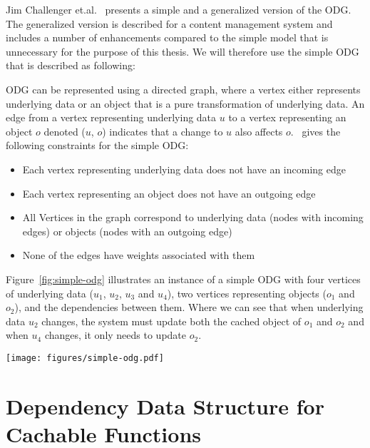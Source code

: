 Jim Challenger et.al.~\cite{paper:ibm-extended} presents a simple and a generalized version of the ODG. The generalized version is described for a content management system and includes a number of enhancements compared to the simple model that is unnecessary for the purpose of this thesis. We will therefore use the simple ODG that is described as following:

ODG can be represented using a directed graph, where a vertex either represents underlying data or an object that is a pure transformation of underlying data. An edge from a vertex representing underlying data $u$ to a vertex representing an object $o$ denoted ($u$, $o$) indicates that a change to $u$ also affects $o$.~\cite{paper:ibm-extended} gives the following constraints for the simple ODG:

\begin{itemize}
  \item Each vertex representing underlying data does not have an incoming edge
  \item Each vertex representing an object does not have an outgoing edge
  \item All Vertices in the graph correspond to underlying data (nodes with incoming edges) or objects (nodes with an outgoing edge)
  \item None of the edges have weights associated with them
\end{itemize}

Figure~\ref{fig:simple-odg} illustrates an instance of a simple ODG with four vertices of underlying data ($u_1$, $u_2$, $u_3$ and $u_4$), two vertices representing objects ($o_1$ and $o_2$), and the dependencies between them. Where we can see that when underlying data $u_2$ changes, the system must update both the cached object of $o_1$ and $o_2$ and when $u_4$ changes, it only needs to update $o_2$.

\begin{figure*}[ht!]
  \centering
  \texttt{[image: figures/simple-odg.pdf]}
  \caption{An example instance of a simple ODG}
  \label{fig:simple-odg}
\end{figure*}


\section{Dependency Data Structure for Cachable Functions}
\label{sec:dependency-data-structure-for-cachable-functions}

